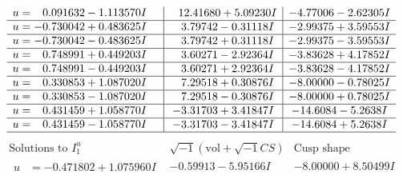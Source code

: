 \documentclass[1p]{elsarticle_modified}
\theoremstyle{definition}
\newcommand{\I}{\sqrt{-1}}
\begin{document}
$$\begin{array}{c|c|c}
\begin{aligned}
u &= \phantom{-}0.091632 - 1.113570 I\end{aligned}
 & \phantom{-}12.41680 + 5.09230 I & -4.77006 - 2.62305 I \\ \hline\begin{aligned}
u &= -0.730042 + 0.483625 I\end{aligned}
 & \phantom{-}3.79742 - 0.31118 I & -2.99375 + 3.59553 I \\ \hline\begin{aligned}
u &= -0.730042 - 0.483625 I\end{aligned}
 & \phantom{-}3.79742 + 0.31118 I & -2.99375 - 3.59553 I \\ \hline\begin{aligned}
u &= \phantom{-}0.748991 + 0.449203 I\end{aligned}
 & \phantom{-}3.60271 - 2.92364 I & -3.83628 + 4.17852 I \\ \hline\begin{aligned}
u &= \phantom{-}0.748991 - 0.449203 I\end{aligned}
 & \phantom{-}3.60271 + 2.92364 I & -3.83628 - 4.17852 I \\ \hline\begin{aligned}
u &= \phantom{-}0.330853 + 1.087020 I\end{aligned}
 & \phantom{-}7.29518 + 0.30876 I & -8.00000 - 0.78025 I \\ \hline\begin{aligned}
u &= \phantom{-}0.330853 - 1.087020 I\end{aligned}
 & \phantom{-}7.29518 - 0.30876 I & -8.00000 + 0.78025 I \\ \hline\begin{aligned}
u &= \phantom{-}0.431459 + 1.058770 I\end{aligned}
 & -3.31703 + 3.41847 I & -14.6084 - 5.2638 I \\ \hline\begin{aligned}
u &= \phantom{-}0.431459 - 1.058770 I\end{aligned}
 & -3.31703 - 3.41847 I & -14.6084 + 5.2638 I\\
 \hline 
 \end{array}$$\newpage$$\begin{array}{c|c|c}  
\text{Solutions to }I^u_{1}& \I (\text{vol} + \sqrt{-1}CS) & \text{Cusp shape}\\
 \hline 
\begin{aligned}
u &= -0.471802 + 1.075960 I\end{aligned}
 & -0.59913 - 5.95166 I & -8.00000 + 8.50499 I \\ \hline\begin{aligned}

\end{aligned}
\end{array}$$
\end{document}
